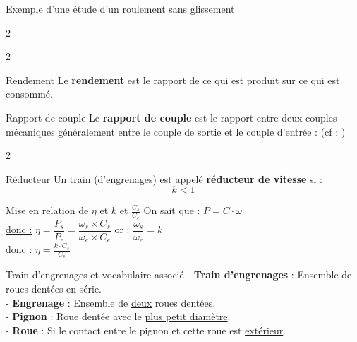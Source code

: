 \documentclass{article} %
\begin{document}
{\begin{exemple}{Exemple d'une étude d'un roulement sans glissement}
\begin{multicols}{2}
\end{multicols}
\end{exemple}\pagebreak
{}
{}
\vspace*{4pt}
\begin{multicols}{2}
\begin{definition}{Rendement}
Le \textbf{rendement} est le rapport de ce qui est produit sur ce qui est consommé.
\end{definition}
\begin{definition}{Rapport de couple}
Le \textbf{rapport de couple} est le rapport entre deux couples mécaniques généralement entre le couple de sortie et le couple d'entrée : \hfill (cf : \textbf{})
\begin{multicols}{2}
\columnbreak
{}
\end{multicols}
\end{definition}
\begin{vocabulaire}{Réducteur}
Un train (d'engrenages) est appelé \textbf{réducteur de vitesse} si :
$$k<1$$
\end{vocabulaire}
\columnbreak
\begin{exemple}{Mise en relation de $\eta$ et $k$ et $\frac{C_s}{C_e}$}
\noindent On sait que : $\boxed{P=C\cdot \omega}$\\
\underline{donc :} $\eta=\dfrac{P_s}{P_e}=\dfrac{\omega_s \times  C_s}{\omega_e\times C_e}$ \hspace*{8pt}or : $\dfrac{\omega_s}{\omega_e}=k$\\
\underline{donc :} $\boxed{\eta=\frac{k\cdot C_s}{ C_e}}$
\end{exemple}
\begin{vocabulaire}{Train d'engrenages et vocabulaire associé}
- \textbf{Train d'engrenages} : Ensemble de roues dentées en série.\vspace{5pt}\\
- \textbf{Engrenage} : Ensemble de \underline{deux} roues dentées.\vspace{5pt}\\
- \textbf{Pignon} : Roue dentée avec le \underline{plus petit diamètre}.\vspace{5pt}\\
- \textbf{Roue} : Si le contact entre le pignon et cette roue 
est \underline{extérieur}.\vspace{5pt}\\

\end{vocabulaire}
\end{multicols}}
\end{document}
